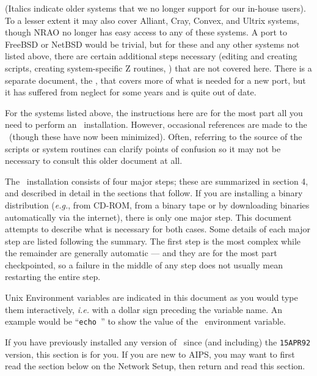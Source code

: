 \noindent (Italics indicate older systems that we no longer support for
our in-house users).  To a lesser extent it may also cover Alliant,
Cray, Convex, and Ultrix systems, though NRAO no longer has easy access
to any of these systems.  A port to FreeBSD or NetBSD would be trivial,
but for these and any other systems not listed above, there are certain
additional steps necessary (editing and creating scripts, creating
system-specific Z routines, \etc) that are not covered here.  There is a
separate document, the \BOH, that covers more of what is needed for a
new port, but it has suffered from neglect for some years and is quite
out of date.

For the systems listed above, the instructions here are for the most
part all you need to perform an \AIPS\ installation.  However,
occasional references are made to the \BOH\ (though these have now been
minimized).  Often, referring to the source of the scripts or system
routines can clarify points of confusion so it may not be necessary to
consult this older document at all.

The \AIPS\ installation consists of four major steps; these are
summarized
in section 4, and described in detail in the sections that follow.  If
you are installing a binary distribution ({\it e.g.\/}, from CD-ROM, from
a binary tape or by downloading binaries automatically via the
internet), there is only one major step.  This document attempts to
describe what is necessary for both cases.  Some details of each major
step are listed following the summary.  The first step is the most
complex while the remainder are generally automatic --- and they are for
the most part checkpointed, so a failure in the middle of any step does
not usually mean restarting the entire step.

Unix Environment variables are indicated in this document as you would
type them interactively, {\it i.e.\/} with a dollar sign preceding the
variable name.  An example would be ``{\tt echo \AROOT}'' to show the
value of the \AROOT\ environment variable.

\vfill\eject%

If you have previously installed any version of \AIPS\ since (and
including) the {\tt 15APR92} version, this section is for you.  If you
are new to AIPS, you may want to first read the section below on the
Network Setup, then return and read this section. \medskip

